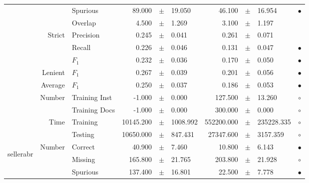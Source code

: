 \begin{longtable}{|r|r|l||rcl|rcl|c|}
&                             &        Spurious &      89.000 &  $\pm$  &      19.050 &      46.100 &  $\pm$  &      16.954 & $\bullet$ \\
&                             &         Overlap &       4.500 &  $\pm$  &       1.269 &       3.100 &  $\pm$  &       1.197 &  \\
& \multirow{3}{*}{    Strict} &       Precision &       0.245 &  $\pm$  &       0.041 &       0.261 &  $\pm$  &       0.071 &  \\
&                             &          Recall &       0.226 &  $\pm$  &       0.046 &       0.131 &  $\pm$  &       0.047 & $\bullet$ \\
&                             &           $F_1$ &       0.232 &  $\pm$  &       0.036 &       0.170 &  $\pm$  &       0.050 & $\bullet$ \\
&                     Lenient &           $F_1$ &       0.267 &  $\pm$  &       0.039 &       0.201 &  $\pm$  &       0.056 & $\bullet$ \\
&                     Average &           $F_1$ &       0.250 &  $\pm$  &       0.037 &       0.186 &  $\pm$  &       0.053 & $\bullet$ \\
& \multirow{2}{*}{    Number} &   Training Inst &      -1.000 &  $\pm$  &       0.000 &     127.500 &  $\pm$  &      13.260 & $\circ$ \\
&                             &   Training Docs &      -1.000 &  $\pm$  &       0.000 &     300.000 &  $\pm$  &       0.000 & $\circ$ \\
& \multirow{2}{*}{      Time} &        Training &   10145.200 &  $\pm$  &    1008.992 &  552200.000 &  $\pm$  &  235228.335 & $\circ$ \\
&                             &         Testing &   10650.000 &  $\pm$  &     847.431 &   27347.600 &  $\pm$  &    3157.359 & $\circ$ \\
\hline
\hline
\multirow{11}{*}{\begin{sideways}sellerabr\end{sideways} }
& \multirow{4}{*}{    Number} &         Correct &      40.900 &  $\pm$  &       7.460 &      10.800 &  $\pm$  &       6.143 & $\bullet$ \\
&                             &         Missing &     165.800 &  $\pm$  &      21.765 &     203.800 &  $\pm$  &      21.928 & $\circ$ \\
&                             &        Spurious &     137.400 &  $\pm$  &      16.801 &      22.500 &  $\pm$  &       7.778 & $\bullet$ \\

\end{longtable}

